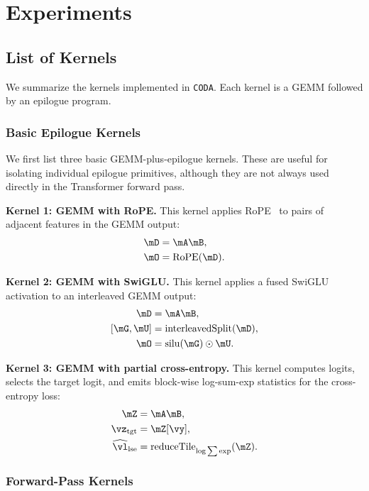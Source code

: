 \section{Experiments}
\subsection{List of Kernels}
\label{sec:list-of-kernels}

We summarize the kernels implemented in \texttt{CODA}. Each kernel is a GEMM followed by an epilogue program.

\subsubsection{Basic Epilogue Kernels}

We first list three basic GEMM-plus-epilogue kernels. These are useful for isolating individual epilogue primitives, although they are not always used directly in the Transformer forward pass.

\textbf{Kernel 1: GEMM with RoPE.}
This kernel applies RoPE~\cite{su2024roformer} to pairs of adjacent features in the GEMM output:
\begin{align*}
\mD &= \mA\mB, \\
\mO &= \operatorname{RoPE}(\mD).
\end{align*}

\textbf{Kernel 2: GEMM with SwiGLU.}
This kernel applies a fused SwiGLU activation to an interleaved GEMM output:
\begin{align*}
\mD &= \mA\mB, \\
[\mG,\mU] &= \operatorname{interleavedSplit}(\mD), \\
\mO &= \operatorname{silu}(\mG) \odot \mU.
\end{align*}

\textbf{Kernel 3: GEMM with partial cross-entropy.}
This kernel computes logits, selects the target logit, and emits block-wise log-sum-exp statistics for the cross-entropy loss:
\begin{align*}
\mZ &= \mA\mB, \\
\vz_{\mathrm{tgt}} &= \mZ[\vy], \\
\widehat{\vl}_{\mathrm{lse}} &= \operatorname{reduceTile}_{\log\sum\exp}(\mZ).
\end{align*}

\subsubsection{Forward-Pass Kernels}

